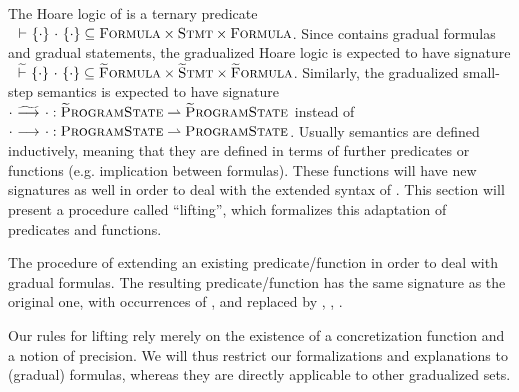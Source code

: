 The Hoare logic of \svl is a ternary predicate ${~} \,\,{\vdash}\,\, \{{\cdot}\} ~{\cdot}~ \{{\cdot}\} \subseteq \textup{\textsc{Formula}} \times \textup{\textsc{Stmt}} \times \textup{\textsc{Formula}}$.
Since \gvl contains gradual formulas and gradual statements, the gradualized Hoare logic is expected to have signature ${~} \,\,\widetilde{\vdash}\,\, \{{\cdot}\} ~{\cdot}~ \{{\cdot}\} \subseteq \textup{\textsc{\ensuremath{\widetilde{\text{F}}}ormula}} \times \textup{\textsc{\ensuremath{\widetilde{\text{S}}}tmt}} \times \textup{\textsc{\ensuremath{\widetilde{\text{F}}}ormula}}$.
Similarly, the gradualized small-step semantics is expected to have signature ${\cdot} \,\,{\widetilde{\longrightarrow}^{}}\,\, {\cdot} : \textup{\textsc{\ensuremath{\widetilde{\text{P}}}rogramState}} \rightharpoonup \textup{\textsc{\ensuremath{\widetilde{\text{P}}}rogramState}}$ instead of ${\cdot} \,\,{\longrightarrow^{}}\,\, {\cdot} : \textup{\textsc{ProgramState}} \rightharpoonup \textup{\textsc{ProgramState}}$.
Usually semantics are defined inductively, meaning that they are defined in terms of further predicates or functions (e.g. implication between formulas).
These functions will have new signatures as well in order to deal with the extended syntax of \gvl.
This section will present a procedure called “lifting”, which formalizes this adaptation of predicates and functions.

\begin{definition}
    The procedure of extending an existing predicate/function in order to deal with gradual formulas.
    The resulting predicate/function has the same signature as the original one, with occurrences of \setFormula, \setStmt and \setProgramState replaced by \setGFormula, \setGStmt, \setGProgramState.
\end{definition}

Our rules for lifting rely merely on the existence of a concretization function and a notion of precision.
We will thus restrict our formalizations and explanations to (gradual) formulas, whereas they are directly applicable to other gradualized sets.